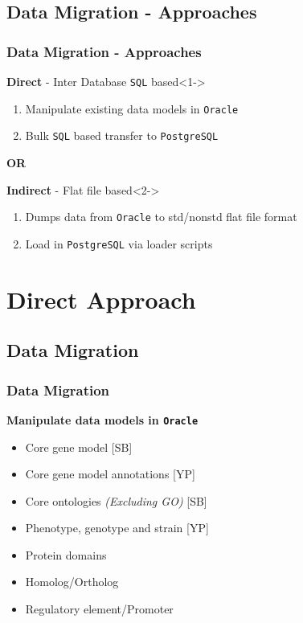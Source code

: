 \documentclass[hyperref={pdfpagelabels=false}, compress]{beamer}
\begin{document}
\subsection{Data Migration - Approaches}
\begin{frame}
    \frametitle{Data Migration - Approaches}

	\begin{block}{\textbf{\huge Direct} - {\Large Inter Database \texttt{SQL} based}}<1->
		\begin{enumerate}
			\item Manipulate existing data models in \texttt{Oracle}
			\item Bulk \texttt{SQL} based transfer to \texttt{PostgreSQL}
		\end{enumerate}
	\end{block}
	
	\begin{center}
		\textbf{OR}
	\end{center}
	
	\begin{block}{\textbf{\huge Indirect} - {\Large Flat file based}}<2->
		\begin{enumerate}
			\item Dumps data from \texttt{Oracle} to std/nonstd flat file format
			\item Load in \texttt{PostgreSQL} via loader scripts
		\end{enumerate}
	\end{block}
	  
\end{frame}

\section{Direct Approach}

\subsection{Data Migration}
\begin{frame}
    \frametitle{Data Migration}
	\textbf{\Large{Manipulate data models in \texttt{Oracle}}}
	\begin{itemize}
		\item Core gene model [SB]
		\item Core gene model annotations [YP]
		\item Core ontologies \textit{(Excluding GO)} [SB]
		\item Phenotype, genotype and strain [YP]
		\item {\color{dark-gray} Protein domains}
		\item {\color{dark-gray} Homolog/Ortholog}
		\item {\color{dark-gray} Regulatory element/Promoter}
	\end{itemize}

\end{frame}
\end{document}
